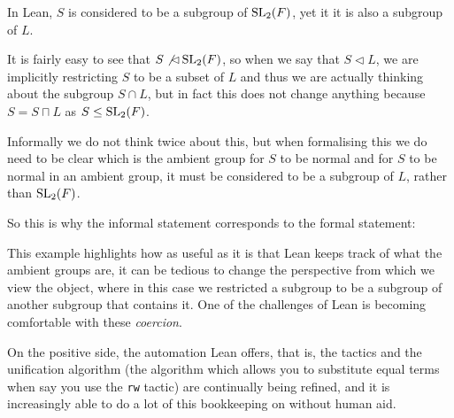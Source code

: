 \begin{remark}
    \label{lattice}
    In Lean, $S$ is considered to be a subgroup of $\operatorname{SL}_2(F)$, yet it it is also a subgroup of $L$. 
    
    It is fairly easy to see that $S \not\lhd \operatorname{SL}_2(F)$, so when we say that $S \lhd L$, 
    we are implicitly restricting $S$ to be a subset of $L$ and thus we are actually thinking about the subgroup $S \cap L$,
    but in fact this does not change anything because $S = S \sqcap L$ as $S \le \operatorname{SL}_2(F)$.

    Informally we do not think twice about this, but when formalising this we do need to be clear which is the ambient group for $S$
    to be normal and for $S$ to be normal in an ambient group, it must be considered to be a subgroup of $L$, rather than $\operatorname{SL}_2(F)$.
    
    So this is why the informal statement corresponds to the formal statement:

    

    This example highlights how as useful as it is that Lean keeps track of what the ambient groups are, it can be tedious to change the perspective from which we view the object, where in this case we restricted
    a subgroup to be a subgroup of another subgroup that contains it. One of the challenges of Lean is becoming comfortable with these \textit{coercion}.
    
    On the positive side, the automation Lean offers, that is, the tactics and the unification algorithm (the algorithm which allows you to substitute equal terms when say you use the \texttt{rw} tactic) are continually being refined, 
    and it is increasingly able to do a lot of this bookkeeping on without human aid.
\end{remark}


